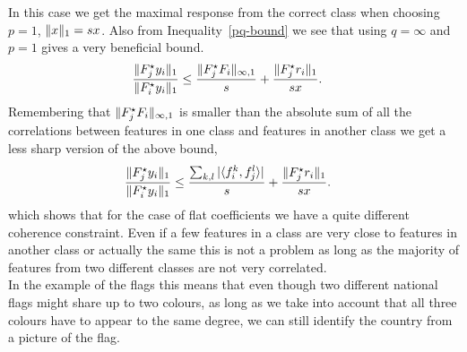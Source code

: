 \documentclass[11pt]{article}
\begin{document}
In this case we get the maximal response from the correct class when choosing $p=1$, \ie $\|x\|_1=sx$. Also from Inequality~\eqref{pq-bound} we see that using $q=\infty$ and $p=1$ gives a very beneficial bound.
\begin{align}
\frac{\|{F}_j^\star {y}_i\|_1}{\|{F}^\star_i{y}_i\|_1} &\leq  \frac{\|{F}_j^\star {F}_i \|_{\infty,1} }{s} +  \frac{\| {F}_j^\star r_i\|_1}{sx}.  \notag
\end{align}
Remembering that $\|{F}_j^\star {F}_i \|_{\infty,1}$ is smaller than the absolute sum of all the correlations between features in one class and features in another class we get a less sharp version of the above bound,
\begin{align}
\frac{\|{F}_j^\star {y}_i\|_1}{\|{F}^\star_i{y}_i\|_1} &\leq  \frac{\sum_{k,l}|\langle {f}_i^k, {f}_j^l\rangle| }{s} +  \frac{\| {F}_j^\star r_i\|_1}{sx}. \notag
\end{align}
which shows that for the case of flat coefficients we have a quite different coherence constraint. Even if a few features in a class are very close to features in another class or actually the same this is not a problem as long as the majority of features from two different classes are not very correlated.\\
In the example of the flags this means that even though two different national flags might share up to two colours, as long as we take into account that all three colours have to appear to the same degree, we can still identify the country from a picture of the flag.

\end{document}
